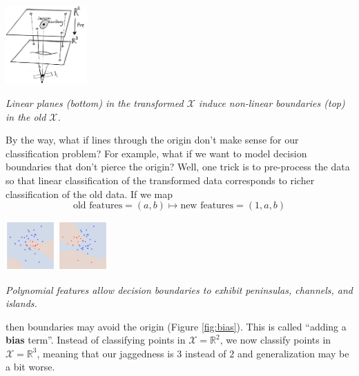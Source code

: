 \documentclass[openany, notitlepage, justified]{tufte-book}
\newcommand{\RR}{\mathbb{R}}
\newcommand{\Xx}{\mathcal{X}}
\begin{document}
            \begin{marginfigure}
                \centering
                \includegraphics[height=3.0cm]{transform-two-three}
                \caption{\emph{
                    Linear planes (bottom) in the transformed $\Xx$ induce
                    non-linear boundaries (top) in the old $\Xx$.
                }}
            \end{marginfigure}
            By the way, what if lines through the origin don't make
            sense for our classification problem?  For example, what if we want
            to model decision boundaries that don't pierce the origin?
            Well, one trick is to pre-process the data so that linear
            classification of the transformed data corresponds to richer
            classification of the old data.  If we map
            $$
                \text{old features} = (a,b)
                \mapsto
                \text{new features} = (1, a, b)
            $$
            {\def\par{\let\par\endgraf}\begin{marginfigure}
                \centering
                \includegraphics[height=1.9cm]{db-cubc-a}
                \includegraphics[height=1.9cm]{db-cubc-b}
                \caption{\emph{
                    Polynomial features allow decision boundaries to exhibit
                    peninsulas, channels, and islands.
                }}
                \label{fig:cubc}
            \end{marginfigure}}%
            then boundaries may avoid the origin (Figure
            \ref{fig:bias}).  This is called ``adding a \textbf{bias} term''.
            Instead of classifying points in $\Xx=\RR^2$, we now classify
            points in $\Xx=\RR^3$, meaning that our jaggedness is $3$ instead
            of $2$ and generalization may be a bit worse.
\end{document}
